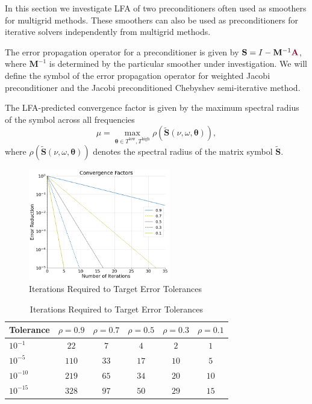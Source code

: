 In this section we investigate LFA of two preconditioners often used as smoothers for multigrid methods.
These smoothers can also be used as preconditioners for iterative solvers independently from multigrid methods.

The error propagation operator for a preconditioner is given by $\mathbf{S} = I - \mathbf{M}^{-1} {\color{burgundy}\mathbf{A}}$, where $\mathbf{M}^{-1}$ is determined by the particular smoother under investigation.
We will define the symbol of the error propagation operator for weighted Jacobi preconditioner and the Jacobi preconditioned Chebyshev semi-iterative method.

The LFA-predicted convergence factor is given by the maximum spectral radius of the symbol across all frequencies
\begin{equation}
\mu = \max_{\boldsymbol{\theta} \in T^{\text{low}}, T^{\text{high}}} \rho \left( \tilde{\mathbf{S}} \left( \nu, \omega, \boldsymbol{\theta} \right) \right),
\end{equation}
where $ \rho \left( \tilde{\mathbf{S}} \left( \nu, \omega, \boldsymbol{\theta} \right)\right)$ denotes the spectral radius of the matrix symbol $\tilde{\mathbf{S}}$.

\begin{figure}[!ht]
  \centering
  \includegraphics[width=0.55\textwidth]{../img/convergenceFactors}
  \caption{Iterations Required to Target Error Tolerances}
  \label{fig:error_tolerance}
\end{figure}

\begin{table}[ht!]
\begin{center}
\begin{tabular}{l c c c c c}
  \toprule
  Tolerance   &  $\rho = 0.9$  &  $\rho = 0.7$  &  $\rho = 0.5$  &  $\rho = 0.3$  &  $\rho = 0.1$  \\
  \toprule
  $10^{-1}$   &  $22$          &  $7$           &  $4$           & $2$            &  $1$           \\
  $10^{-5}$   &  $110$         &  $33$          &  $17$          & $10$           &  $5$           \\
  $10^{-10}$  &  $219$         &  $65$          &  $34$          & $20$           &  $10$          \\
  $10^{-15}$  &  $328$         &  $97$          &  $50$          & $29$           &  $15$          \\
  \bottomrule
\end{tabular}
\end{center}
\caption{Iterations Required to Target Error Tolerances}
\label{table:error_tolerance}
\end{table}

